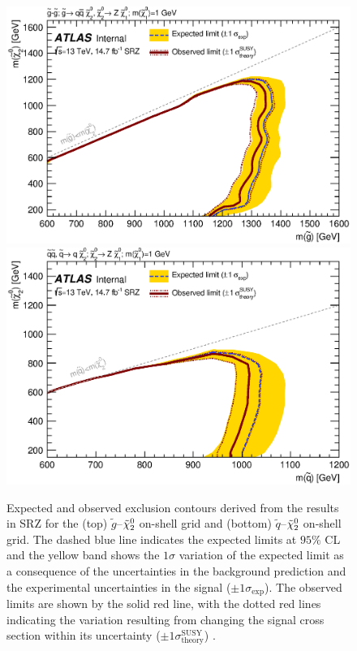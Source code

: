 \begin{figure}[!htb]
\centering
\includegraphics[width=.8\textwidth]{figures/interpretation/excl_SM_GG_N2_1.eps}
\includegraphics[width=.8\textwidth]{figures/interpretation/excl_SM_SS_N2.eps}  
\caption{
Expected and observed exclusion contours derived from the results in SRZ for the (top) $\tilde{g}$--$\tilde{\chi}_2^0$ on-shell grid and (bottom) $\tilde{q}$--$\tilde{\chi}_2^0$ on-shell grid. 
The dashed blue line indicates the expected limits at $95\%$ CL and the yellow band shows the $1\sigma$ variation of the expected limit as a consequence of the uncertainties in the background prediction and the experimental uncertainties in the signal ($\pm1\sigma_\text{exp}$). 
The observed limits are shown by the solid red line, with the dotted red lines indicating the variation resulting from changing the signal cross section within its uncertainty ($\pm1\sigma^\text{SUSY}_\text{theory}$) \cite{this_paper}. \label{fig:excl_SMGGN2_1}
}
\end{figure}

